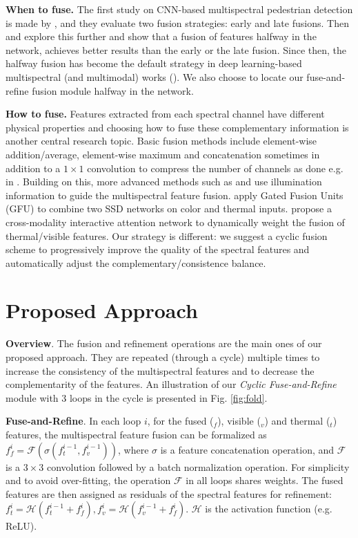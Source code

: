 \documentclass{article}
\begin{document}
\noindent
\textbf{When to fuse.} The first study on CNN-based multispectral pedestrian detection is made by \cite{DFCNN}, and they evaluate two fusion strategies: early and late fusions. Then \cite{TestAnno} and \cite{Illumination-aware-li} explore this further and show that a fusion of features halfway in the network, achieves better results than the early or the late fusion. Since then, the halfway fusion has become the default strategy in deep learning-based multispectral (and multimodal) works (\cite{Illumination-aware-li,Illumination-aware-guan,MSDS,CIAN,AR-CNN}). We also choose to locate our fuse-and-refine fusion module halfway in the network.

\noindent
\textbf{How to fuse.} Features extracted from each spectral channel have different physical properties and choosing how to fuse these complementary information is another central research topic. Basic fusion methods include element-wise addition/average, element-wise maximum and concatenation sometimes in addition to a $1\times1$ convolution to compress the number of channels as done e.g. in \cite{NIN}. Building on this, more advanced methods such as \cite{Illumination-aware-li} and \cite{Illumination-aware-guan} use illumination information to guide the multispectral feature fusion. \cite{GFD-SSD} apply Gated Fusion Units (GFU) \cite{GFU} to combine two SSD networks \cite{SSD} on color and thermal inputs. \cite{CIAN} propose a cross-modality interactive attention network to dynamically weight the fusion of thermal/visible features. Our strategy is  different: we suggest a cyclic fusion scheme to progressively improve the quality of the spectral features and automatically adjust the complementary/consistence balance. \section{Proposed Approach}
\label{sec:approach}

\noindent
\textbf{Overview}. The fusion and refinement operations are the main ones of our proposed approach. They are repeated (through a cycle) multiple times to increase the consistency of the multispectral features and to decrease the complementarity of the features.
An illustration of our \textit{Cyclic Fuse-and-Refine} module with 3 loops in the cycle is presented in Fig. \ref{fig:fold}. 

\noindent
\textbf{Fuse-and-Refine}. In each loop $i$, for the fused ($_f$), visible ($_v$) and thermal ($_t$) features, the multispectral feature fusion can be formalized as $f_{f}^{i} = \mathcal{F}(\sigma(f_{t}^{i-1}, f_{v}^{i-1}))$, where $\sigma$ is a feature concatenation operation, and $\mathcal{F}$ is a $3\times3$ convolution followed by a batch normalization operation.
For simplicity and to avoid over-fitting, the operation $\mathcal{F}$ in all loops shares weights.
The fused features are then assigned as residuals of the spectral features for refinement: $f_{t}^{i} = \mathcal{H}(f_{t}^{i-1}+f_{f}^{i}), f_{v}^{i} = \mathcal{H}(f_{v}^{i-1}+f_{f}^{i})$. $\mathcal{H}$ is the activation function (e.g. ReLU).
\end{document}
